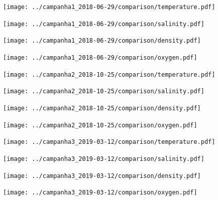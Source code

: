 \documentclass{article}
\begin{document}
\begin{figure}
	\texttt{[image: ../campanha1\_2018-06-29/comparison/temperature.pdf]}
\end{figure}

\begin{figure}
	\texttt{[image: ../campanha1\_2018-06-29/comparison/salinity.pdf]}
\end{figure}

\begin{figure}
	\texttt{[image: ../campanha1\_2018-06-29/comparison/density.pdf]}
\end{figure}

\begin{figure}
	\texttt{[image: ../campanha1\_2018-06-29/comparison/oxygen.pdf]}
\end{figure}

\begin{figure}
	\texttt{[image: ../campanha2\_2018-10-25/comparison/temperature.pdf]}
\end{figure}

\begin{figure}
	\texttt{[image: ../campanha2\_2018-10-25/comparison/salinity.pdf]}
\end{figure}

\begin{figure}
	\texttt{[image: ../campanha2\_2018-10-25/comparison/density.pdf]}
\end{figure}

\begin{figure}
	\texttt{[image: ../campanha2\_2018-10-25/comparison/oxygen.pdf]}
\end{figure}

\begin{figure}
	\texttt{[image: ../campanha3\_2019-03-12/comparison/temperature.pdf]}
\end{figure}

\begin{figure}
	\texttt{[image: ../campanha3\_2019-03-12/comparison/salinity.pdf]}
\end{figure}

\begin{figure}
	\texttt{[image: ../campanha3\_2019-03-12/comparison/density.pdf]}
\end{figure}

\begin{figure}
	\texttt{[image: ../campanha3\_2019-03-12/comparison/oxygen.pdf]}
\end{figure}
\end{document}
